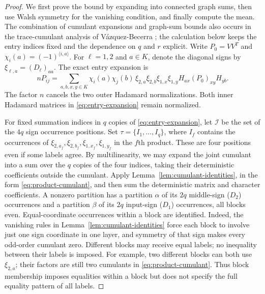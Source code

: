 \documentclass[11pt]{article}
\theoremstyle{definition}
\theoremstyle{remark}
\theoremstyle{plain}
\begin{document}
\begin{proof}
We first prove the bound by expanding into connected graph sums,
then use Walsh symmetry for the vanishing condition, and finally
compute the mean.
The combination of cumulant expansions and graph-sum bounds also
occurs in the trace-cumulant analysis of V\'azquez-Becerra
\cite[Section~4]{vazquez_becerra}; the calculation below keeps the
entry indices fixed and the dependence on $q$ and $r$ explicit.
Write \(P_0=VV^T\) and \(\chi_i(a)=(-1)^{\langle i,a\rangle}\).
For $\ell=1,2$ and $a\in K$, denote the diagonal signs by
$\xi_{\ell,a}=(D_\ell)_{aa}$. The exact entry expansion is
\begin{equation}\label{eq:entry-expansion}
 nP_{ij}=\sum_{a,b,x,y\in K}
 \chi_i(a)\chi_j(b)\,
 \xi_{2,a}\xi_{2,b}\xi_{1,x}\xi_{1,y}
                  H_{ax}(P_0)_{xy}H_{yb}.
\end{equation}
The factor \(n\) cancels the two outer Hadamard normalizations.
Both inner Hadamard matrices in \eqref{eq:entry-expansion} remain normalized.

For fixed summation indices in $q$ copies of
\eqref{eq:entry-expansion}, let $\mathcal I$ be the set of the
$4q$ sign occurrence positions. Set $\tau=\{I_1,\ldots,I_q\}$,
where $I_f$ contains the occurrences of
$\xi_{2,a_f},\xi_{2,b_f},\xi_{1,x_f},\xi_{1,y_f}$ in the
$f$th product. These are four positions even if some labels agree.
By multilinearity, we may expand the joint cumulant into a sum over
the $q$ copies of the four indices, taking their deterministic
coefficients outside the cumulant. Apply
Lemma~\ref{lem:cumulant-identities}, in the form
\eqref{eq:product-cumulant}, and then sum the deterministic
matrix and character coefficients. A nonzero partition
has a partition \(\alpha\) of its \(2q\) middle-sign ($D_2$) occurrences
and a partition \(\beta\) of its \(2q\) input-sign ($D_1$) occurrences,
all blocks even. Equal-coordinate occurrences within a block are identified.
Indeed, the vanishing rules in Lemma~\ref{lem:cumulant-identities}
force each block to involve just one sign
coordinate in one layer, and symmetry of that sign makes every
odd-order cumulant zero.
Different blocks may receive equal labels; no inequality between
their labels is imposed. For example, two different blocks can
both use $\xi_{2,a}$; their factors are still two cumulants in
\eqref{eq:product-cumulant}. Thus block membership imposes equalities
within a block but does not specify the full equality pattern of
all labels.


\end{proof}
\end{document}
